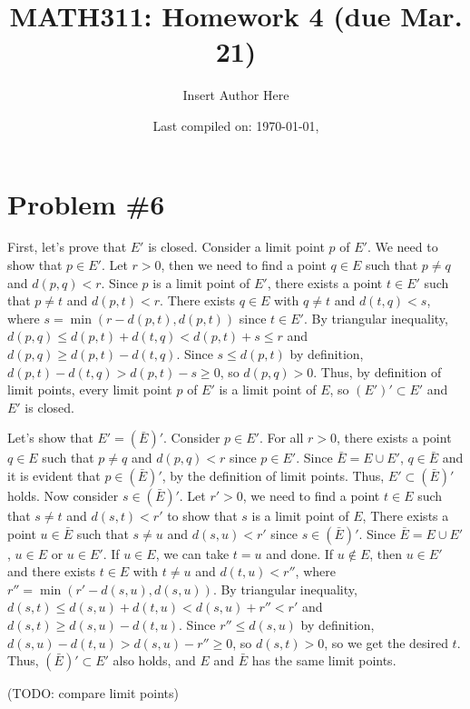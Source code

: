 \documentclass{scrartcl}
\title{MATH311: Homework 4 (due Mar. 21)}
\author{Insert Author Here}
\date{Last compiled on: \today, \currenttime}
\begin{document}
\maketitle

\section{Problem \#6}
First, let's prove that \(E'\) is closed.
Consider a limit point \(p\) of \(E'\).
We need to show that \(p \in E'\).
Let \(r > 0\), then we need to find a point \(q \in E\) such that \(p \not = q\) and \(d(p, q) < r\).
Since \(p\) is a limit point of \(E'\), there exists a point \(t \in E'\) such that \(p \not = t\) and \(d(p, t) < r\).
There exists \(q \in E\) with \(q \not = t\) and \(d(t, q) < s\), where \(s = \min(r - d(p, t), d(p, t))\) since \(t \in E'\).
By triangular inequality, \(d(p, q) \leq d(p, t) + d(t, q) < d(p, t) + s \leq r\) and \(d(p, q) \geq d(p, t) - d(t, q)\).
Since \(s \leq d(p, t)\) by definition, \(d(p, t) - d(t, q) > d(p, t) - s \geq 0\), so \(d(p, q) > 0\).
Thus, by definition of limit points, every limit point \(p\) of \(E'\) is a limit point of \(E\), so \((E')' \subset E'\) and \(E'\) is closed.

Let's show that \(E' = (\bar{E})'\).
Consider \(p \in E'\).
For all \(r > 0\), there exists a point \(q \in E\) such that \(p \not = q\) and \(d(p, q) < r\) since \(p \in E'\).
Since \(\bar{E} = E \cup E'\), \(q \in \bar{E}\) and it is evident that \(p \in (\bar{E})'\), by the definition of limit points.
Thus, \(E' \subset (\bar{E})'\) holds.
Now consider \(s \in (\bar{E})'\).
Let \(r' > 0\), we need to find a point \(t \in E\) such that \(s \not = t\) and \(d(s, t) < r'\) to show that \(s\) is a limit point of \(E\),
There exists a point \(u \in \bar{E}\) such that \(s \not = u\) and \(d(s, u) < r'\) since \(s \in (\bar{E})'\).
Since \(\bar{E} = E \cup E'\), \(u \in E\) or \(u \in E'\).
If \(u \in E\), we can take \(t = u\) and done.
If \(u \not \in E\), then \(u \in E'\) and there exists \(t \in E\) with \(t \not = u\) and \(d(t, u) < r''\), where \(r'' = \min(r' - d(s, u), d(s, u))\).
By triangular inequality, \(d(s, t) \leq d(s, u) + d(t, u) < d(s, u) + r'' < r'\) and \(d(s, t) \geq d(s, u) - d(t, u)\).
Since \(r'' \leq d(s, u)\) by definition, \(d(s, u) - d(t, u) > d(s, u) - r'' \geq 0\), so \(d(s, t) > 0\), so we get the desired \(t\).
Thus, \((\bar{E})' \subset E'\) also holds, and \(E\) and \(\bar{E}\) has the same limit points.

(TODO: compare limit points)
\end{document}
